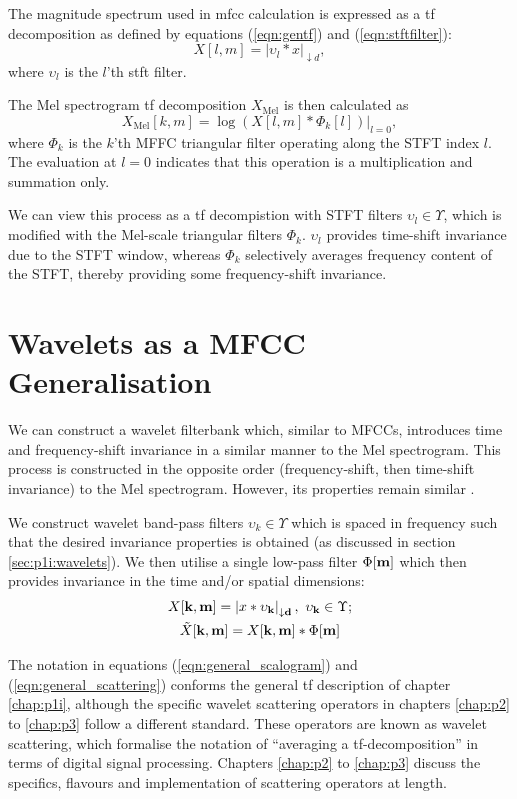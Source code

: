 The magnitude spectrum used in \ac{mfcc} calculation is expressed as a \ac{tf} decomposition as defined by equations (\ref*{eqn:gentf}) and (\ref*{eqn:stftfilter}):
\begin{equation}
    X[l, m] = |\upsilon_l * x|_{\downarrow d},
\end{equation}
where $\upsilon_l$ is the $l$'th \ac{stft} filter.

The Mel spectrogram \ac{tf} decomposition $X_\text{Mel}$ is then calculated as
\begin{equation}
    X_\text{Mel}[k, m] = \log\left(X[l, m] * \Phi_k[l]\right) \bigg|_{l = 0},
\end{equation}
where $\Phi_k$ is the $k$'th MFFC triangular filter operating along the STFT index $l$. The evaluation at $l=0$ indicates that this operation is a multiplication and summation only. 

We can view this process as a \ac{tf} decompistion with STFT filters $\upsilon_l \in \Upsilon$, which is modified with the Mel-scale triangular filters $\Phi_k$. $\upsilon_l$ provides time-shift invariance due to the STFT window, whereas $\Phi_k$ selectively averages frequency content of the STFT, thereby providing some frequency-shift invariance.


\section{Wavelets as a MFCC Generalisation}

We can construct a wavelet filterbank which, similar to MFCCs, introduces time and frequency-shift invariance in a similar manner to the Mel spectrogram. This process is constructed in the opposite order (frequency-shift, then time-shift invariance) to the Mel spectrogram. However, its properties remain similar \cite{ws}.

We construct wavelet band-pass filters $\upsilon_k \in \Upsilon$ which is spaced in frequency such that the desired invariance properties is obtained (as discussed in section \ref*{sec:p1i:wavelets}). We then utilise a single low-pass filter $\Phi[\boldsymbol{\mathbf{m}}]$ which then provides invariance in the time and/or spatial dimensions:
\begin{gather}
    \label{eqn:general_scalogram}
    X[\boldsymbol{\mathbf{k}}, \boldsymbol{\mathbf{m}}] = \left|x * \upsilon_{\boldsymbol{\mathbf{k}}}\right|_{\downarrow \boldsymbol{\mathbf{d}}}, \ \upsilon_{\boldsymbol{\mathbf{k}}} \in \Upsilon; \\
    \label{eqn:general_scattering}
    \tilde{X}[\boldsymbol{\mathbf{k}}, \boldsymbol{\mathbf{m}}] = X[\boldsymbol{\mathbf{k}}, \boldsymbol{\mathbf{m}}] * \Phi[\boldsymbol{\mathbf{m}}]
\end{gather}

The notation in equations (\ref*{eqn:general_scalogram}) and (\ref*{eqn:general_scattering}) conforms the general \ac{tf} description of chapter \ref*{chap:p1i}, although the specific wavelet scattering operators in chapters \ref*{chap:p2} to \ref*{chap:p3} follow a different standard. These operators are known as wavelet scattering, which formalise the notation of ``averaging a \ac{tf}-decomposition'' in terms of digital signal processing. Chapters \ref*{chap:p2} to \ref*{chap:p3} discuss the specifics, flavours and implementation of scattering operators at length.

